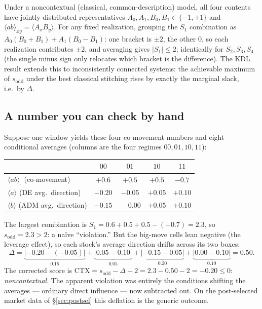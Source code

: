 \documentclass[11pt]{article}
\newcommand{\E}[1]{\langle ab\rangle_{#1}}
\newcommand{\sodd}{s_{\mathrm{odd}}}
\begin{document}
\begin{derivationbox}[Why the classical bound is $2$ at $\Delta=0$]
Under a noncontextual (classical, common-description) model, all four contents have jointly
distributed representatives $A_0,A_1,B_0,B_1\in\{-1,+1\}$ and $\E{xy}=\langle A_xB_y\rangle$.
For any fixed realization, grouping the $S_1$ combination as
$A_0(B_0+B_1)+A_1(B_0-B_1)$: one bracket is $\pm2$, the other $0$, so each realization
contributes $\pm2$, and averaging gives $|S_1|\le2$; identically for $S_2,S_3,S_4$ (the single
minus sign only relocates which bracket is the difference). The KDL result extends this to
inconsistently connected systems: the achievable maximum of $\sodd$ under the best classical
stitching rises by exactly the marginal slack, i.e.\ by $\Delta$.
\end{derivationbox}

\subsection{A number you can check by hand}

\begin{derivationbox}
Suppose one window yields these four co-movement numbers and eight conditional averages
(columns are the four regimes $00,01,10,11$):
\begin{center}\small
\renewcommand{\arraystretch}{1.2}
\begin{tabular}{l|cccc}
 & $00$ & $01$ & $10$ & $11$\\\hline
$\E{\cdot}$ \;(co-movement) & $+0.6$ & $+0.5$ & $+0.5$ & $-0.7$\\
$\langle a\rangle$ \;(DE avg.\ direction) & $-0.20$ & $-0.05$ & $+0.05$ & $+0.10$\\
$\langle b\rangle$ \;(ADM avg.\ direction) & $-0.15$ & $\phantom{+}0.00$ & $+0.05$ & $+0.10$\\
\end{tabular}
\end{center}
The largest combination is $S_1=0.6+0.5+0.5-(-0.7)=2.3$, so $\sodd=2.3>2$: a na\"ive
``violation.'' But the big-move cells lean negative (the leverage effect), so each stock's
average direction drifts across its two boxes:
\[
  \Delta = \underbrace{|{-}0.20-({-}0.05)|}_{0.15}
         + \underbrace{|0.05-0.10|}_{0.05}
         + \underbrace{|{-}0.15-0.05|}_{0.20}
         + \underbrace{|0.00-0.10|}_{0.10}
         = 0.50.
\]
The corrected score is $\mathrm{CTX}=\sodd-\Delta-2 = 2.3-0.50-2 = -0.20 \le 0$:
\emph{noncontextual}. The apparent violation was entirely the conditions shifting the averages
--- ordinary direct influence --- now subtracted out. On the post-selected market data of
\S\ref{sec:postsel} this deflation is the generic outcome.
\end{derivationbox}
\end{document}
